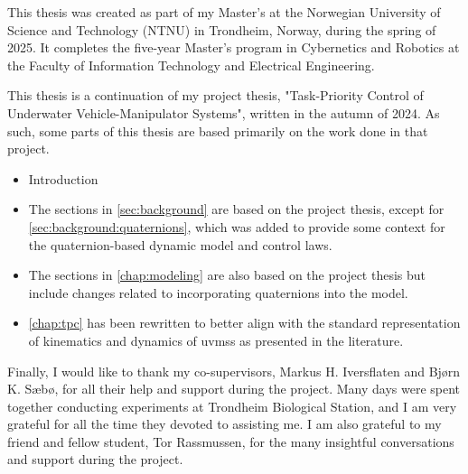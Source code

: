 This thesis was created as part of my Master's at the Norwegian University of Science and Technology (NTNU) in Trondheim, Norway, during the spring of 2025. It completes the five-year Master's program in Cybernetics and Robotics at the Faculty of Information Technology and Electrical Engineering.

This thesis is a continuation of my project thesis, "Task-Priority Control of Underwater Vehicle-Manipulator Systems", written in the autumn of 2024. As such, some parts of this thesis are based primarily on the work done in that project. 

\begin{itemize}
    \item Introduction 
    \item The sections in \autoref{sec:background} are based on the project thesis, except for \autoref{sec:background:quaternions}, which was added to provide some context for the quaternion-based dynamic model and control laws.
    \item The sections in \autoref{chap:modeling} are also based on the project thesis but include changes related to incorporating quaternions into the model.
    \item \autoref{chap:tpc} has been rewritten to better align with the standard representation of kinematics and dynamics of \gls{uvms}s as presented in the literature.
\end{itemize}

Finally, I would like to thank my co-supervisors, Markus H. Iversflaten and Bjørn K. Sæbø, for all their help and support during the project. Many days were spent together conducting experiments at Trondheim Biological Station, and I am very grateful for all the time they devoted to assisting me. I am also grateful to my friend and fellow student, Tor Rassmussen, for the many insightful conversations and support during the project.
